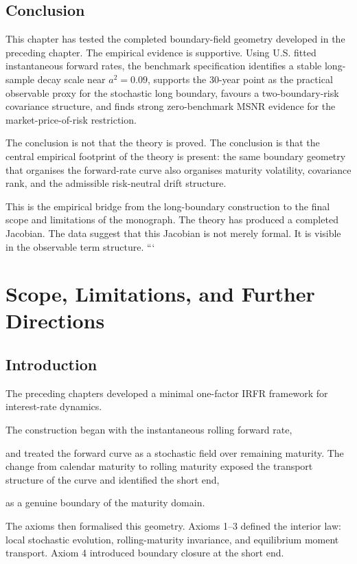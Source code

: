 \documentclass[11pt,oneside]{book}
\begin{document}
\section{Conclusion}

This chapter has tested the completed boundary-field geometry developed in the preceding chapter. The empirical evidence is supportive. Using U.S. fitted instantaneous forward rates, the benchmark specification identifies a stable long-sample decay scale near \(a^2=0.09\), supports the 30-year point as the practical observable proxy for the stochastic long boundary, favours a two-boundary-risk covariance structure, and finds strong zero-benchmark MSNR evidence for the market-price-of-risk restriction.

The conclusion is not that the theory is proved. The conclusion is that the central empirical footprint of the theory is present: the same boundary geometry that organises the forward-rate curve also organises maturity volatility, covariance rank, and the admissible risk-neutral drift structure.

This is the empirical bridge from the long-boundary construction to the final scope and limitations of the monograph. The theory has produced a completed Jacobian. The data suggest that this Jacobian is not merely formal. It is visible in the observable term structure.
```

\chapter{Scope, Limitations, and Further Directions}\label{chapter-13}

\section{Introduction}\label{introduction-9}

The preceding chapters developed a minimal one-factor IRFR framework for
interest-rate dynamics.

The construction began with the instantaneous rolling forward rate,

and treated the forward curve as a stochastic field over remaining
maturity. The change from calendar maturity to rolling maturity exposed
the transport structure of the curve and identified the short end,

as a genuine boundary of the maturity domain.

The axioms then formalised this geometry. Axioms 1--3 defined the
interior law: local stochastic evolution, rolling-maturity invariance,
and equilibrium moment transport. Axiom 4 introduced boundary closure at
the short end.
\end{document}
